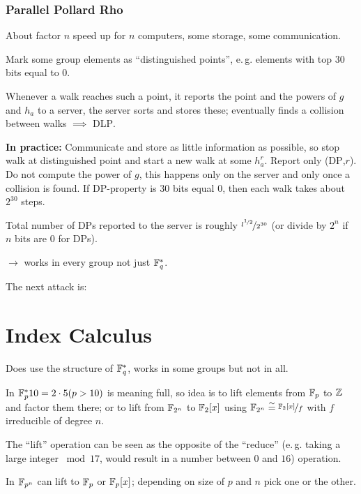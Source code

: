 \subsubsection{Parallel Pollard Rho}

About factor $n$ speed up for $n$ computers, some storage, some communication.

Mark some group elements as ``distinguished points'', e.\,g. elements with top $30$ bits equal to $0$.

Whenever a walk reaches such a point, it reports the point and the powers of $g$ and $h_a$ to a server, the server sorts and stores these; eventually finds a collision between walks $\implies$ \textsc{DLP}.

\textbf{In practice:} Communicate and store as little information as possible, so stop walk at distinguished point and start a new walk at some $h_a^r$. Report only (\textsc{DP},$r$). Do not compute the power of $g$, this happens only on the server and only once a collision is found. If \textsc{DP}-property is $30$ bits equal $0$, then each walk takes about $2^{30}$ steps.

Total number of \textsc{DP}s reported to the server is roughly $\nicefrac{l^{\nicefrac{1}{2}}}{2^{30}}$ (or divide by $2^n$ if $n$ bits are $0$ for \textsc{DP}s).

$\rightarrow$ works in every group not just $\mathbb{F}_q^{\ast}$.

The next attack is:

\section{Index Calculus}

Does use the structure of $\mathbb{F}_q^{\ast}$, works in some groups but not in all.

In $\mathbb{F}_p^{\ast} 10 = 2 \cdot 5 (p > 10)$ is meaning full, so idea is to lift elements from $\mathbb{F}_p$ to $\mathbb{Z}$ and factor them there; or to lift from $\mathbb{F}_{2^n}$ to $\mathbb{F}_2 [x]$ using $\mathbb{F}_{2^n} \overset{\sim}{=} \nicefrac{\mathbb{F}_2 [x]}{f}$ with $f$ irreducible of degree $n$.

\begin{remark}
The ``lift'' operation can be seen as the opposite of the ``reduce'' (e.\,g. taking a large integer $\bmod 17$, would result in a number between $0$ and $16$) operation.
\end{remark}

In $\mathbb{F}_{p^n}$ can lift to $\mathbb{F}_p$ or $\mathbb{F}_p [x]$; depending on size of $p$ and $n$ pick one or the other.

